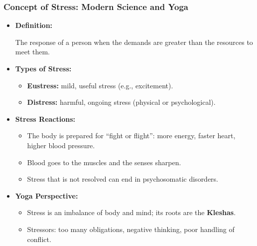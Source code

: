 \begin{frame}[fragile]\frametitle{Concept of Stress: Modern Science and Yoga}

    \begin{itemize}
        \item \textbf{Definition:}
        
        The response of a person when the demands are greater than the resources to meet them.

        \item \textbf{Types of Stress:}
        \begin{itemize}
            \item \textbf{Eustress:} mild, useful stress (e.g., excitement).
            \item \textbf{Distress:} harmful, ongoing stress (physical or psychological).
        \end{itemize}
        \item \textbf{Stress Reactions:}
        \begin{itemize}
            \item The body is prepared for ``fight or flight'': more energy, faster heart, higher blood pressure.
            \item Blood goes to the muscles and the senses sharpen.
            \item Stress that is not resolved can end in psychosomatic disorders.
        \end{itemize}
        \item \textbf{Yoga Perspective:}
        \begin{itemize}
            \item Stress is an imbalance of body and mind; its roots are the \textbf{Kleshas}.
            \item Stressors: too many obligations, negative thinking, poor handling of conflict.
        \end{itemize}
    \end{itemize}

\end{frame}

